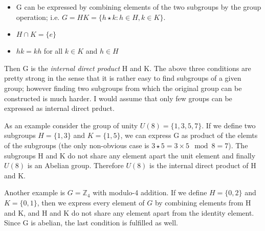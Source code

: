 \begin{itemize}
\item
  G can be expressed by combining elements of the two subgroups by the
  group operation; i.e. \(G = HK = \{ h \star k : h \in H, k \in K \}\).
\item
  \(H \cap K = \{ e \}\)
\item
  \(hk = kh\) for all \(k \in K\) and \(h \in H\)
\end{itemize}

Then G is the \emph{internal direct product} H and K. The above three
conditions are pretty strong in the sense that it is rather easy to find
subgroups of a given group; however finding two subgroups from which the
original group can be constructed is much harder. I would assume that
only few groups can be expressed as internal direct prduct.

As an example consider the group of unity \(U(8) = \{1,3,5,7\}\). If we
define two subgroups \(H = \{1,3\}\) and \(K = \{1,5\}\), we can express
G as product of the elemts of the subgroups (the only non-obvious case
is \(3 \star 5 = 3 \times 5 \mod 8 = 7\)). The subgroups H and K do not
share any element apart the unit element and finally \(U(8)\) is an
Abelian group. Therefore \(U(8)\) is the internal direct product of H
and K.

Another example is \(G = \mathbb{Z}_4\) with modulo-4 addition. If we
define \(H=\{0,2\}\) and \(K=\{0,1\}\), then we express every element of
\(G\) by combining elements from H and K, and H and K do not share any
element apart from the identity element. Since G is abelian, the last
condition is fulfilled as well.
